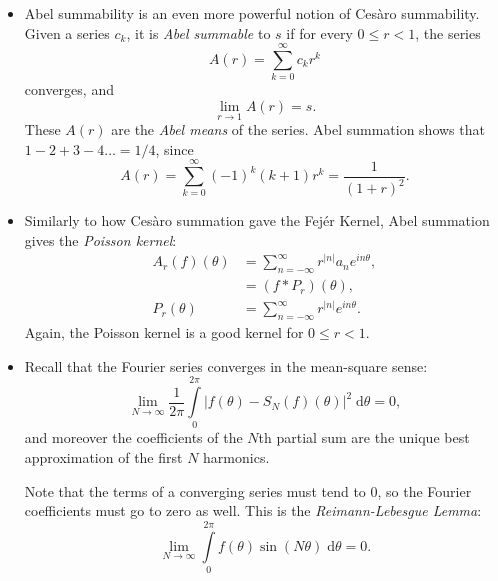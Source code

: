 \documentclass[11pt,
        usenames, %
        dvipsnames %
    ]{report}
\newcommand*{\abs}[1]{\left|#1\right|}
\newcommand*{\p}[1]{\left(#1\right)}
\begin{document}
\begin{itemize}
    \item Abel summability is an even more powerful notion of Ces\`aro
        summability. Given a series $c_k$, it is \emph{Abel summable} to $s$ if
        for every $0 \leq r < 1$, the series
        \begin{equation}
            A(r) = \sum\limits_{k = 0}^\infty c_kr^k
        \end{equation}
        converges, and
        \begin{equation}
            \lim_{r \to 1}A(r) = s.
        \end{equation}
        These $A(r)$ are the \emph{Abel means} of the series. Abel summation
        shows that $1 - 2 + 3 - 4 \dots = 1/4$, since
        \begin{equation}
            A(r) = \sum\limits_{k = 0}^\infty \p{-1}^k(k + 1)r^k
                = \frac{1}{(1+r)^2}.
        \end{equation}

    \item Similarly to how Ces\`aro summation gave the Fej\'er Kernel, Abel
        summation gives the \emph{Poisson kernel}:
        \begin{align}
            A_r(f)(\theta) &= \sum\limits_{n = -\infty}^\infty r^{\abs{n}}
                    a_ne^{in\theta},\\
                &= (f * P_r)(\theta),\\
            P_r(\theta) &= \sum\limits_{n = -\infty}^\infty
                r^{\abs{n}}e^{in\theta}.
        \end{align}
        Again, the Poisson kernel is a good kernel for $0 \leq r < 1$.

    \item Recall that the Fourier series converges in the mean-square sense:
        \begin{equation}
            \lim_{N \to \infty} \frac{1}{2\pi}\int\limits_{0}^{2\pi}
                \abs{f(\theta) - S_N(f)(\theta)}^2\;\mathrm{d}\theta
                    = 0,
        \end{equation}
        and moreover the coefficients of the $N$th partial sum are the unique
        best approximation of the first $N$ harmonics.

        Note that the terms of a converging series must tend to $0$, so the
        Fourier coefficients must go to zero as well. This is the
        \emph{Reimann-Lebesgue Lemma}:
        \begin{equation}
            \lim_{N \to \infty}
                \int\limits_0^{2\pi}f(\theta)\sin(N\theta)\;\mathrm{d}\theta
                = 0.
        \end{equation}


\end{itemize}
\end{document}
